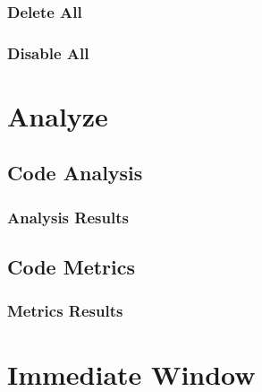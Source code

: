 \documentclass {amsart}
\begin{document}
		\subsubsection{Delete All}
		\subsubsection{Disable All}




\section{Analyze}
	\subsection{Code Analysis}
		\subsubsection{Analysis Results}
	\subsection{Code Metrics}
		\subsubsection{Metrics Results}


\section{Immediate Window}
\end{document}
